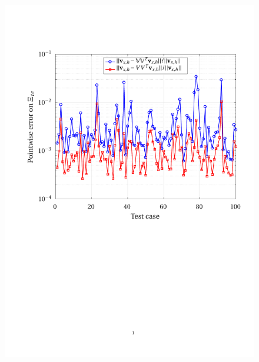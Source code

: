 \documentclass[12pt, a4paper, twoside, openright]{report}
\numberwithin{equation}{chapter}
\theoremstyle{theorem}
\theoremstyle{definition}
\theoremstyle{remark}
\theoremstyle{proposition}
\numberwithin{figure}{chapter}
\begin{document}
	\begin{figure}[H]
		\center
		\includegraphics[scale = 0.75, trim = {1.5cm 11cm 1cm 3.5cm}, clip]{dc_200_vx_pointwise_error}
	\end{figure}
	
\end{document}
